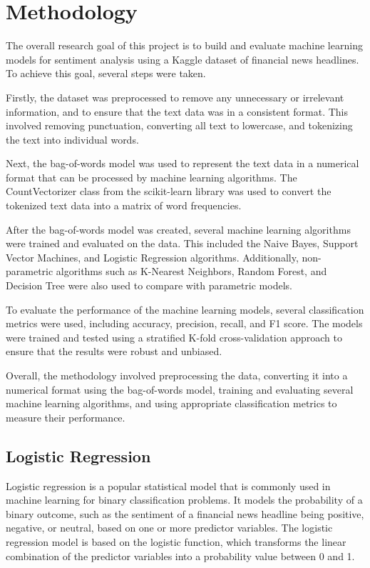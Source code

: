 \documentclass{article}
\begin{document}
\section{Methodology}

The overall research goal of this project is to build and evaluate machine learning models for sentiment analysis using a Kaggle dataset of financial news headlines. To achieve this goal, several steps were taken.

Firstly, the dataset was preprocessed to remove any unnecessary or irrelevant information, and to ensure that the text data was in a consistent format. This involved removing punctuation, converting all text to lowercase, and tokenizing the text into individual words.

Next, the bag-of-words model was used to represent the text data in a numerical format that can be processed by machine learning algorithms. The CountVectorizer class from the scikit-learn library was used to convert the tokenized text data into a matrix of word frequencies.

After the bag-of-words model was created, several machine learning algorithms were trained and evaluated on the data. This included the Naive Bayes, Support Vector Machines, and Logistic Regression algorithms. Additionally, non-parametric algorithms such as K-Nearest Neighbors, Random Forest, and Decision Tree were also used to compare with parametric models.

To evaluate the performance of the machine learning models, several classification metrics were used, including accuracy, precision, recall, and F1 score. The models were trained and tested using a stratified K-fold cross-validation approach to ensure that the results were robust and unbiased.

Overall, the methodology involved preprocessing the data, converting it into a numerical format using the bag-of-words model, training and evaluating several machine learning algorithms, and using appropriate classification metrics to measure their performance.

\subsection{Logistic Regression}

Logistic regression is a popular statistical model that is commonly used in machine learning for binary classification problems. It models the probability of a binary outcome, such as the sentiment of a financial news headline being positive, negative, or neutral, based on one or more predictor variables. The logistic regression model is based on the logistic function, which transforms the linear combination of the predictor variables into a probability value between 0 and 1.
\end{document}
